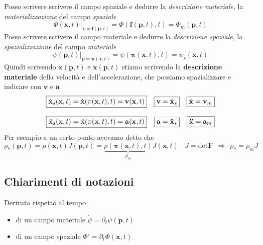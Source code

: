 \documentclass[10pt,a4paper,twoside]{book}
\begin{document}
Posso scrivere scrivere il campo spaziale e dedurre la \textit{descrizione materiale}, la \textit{materializzazione} del campo \textit{spaziale}
\begin{equation*}
\Phi (\mathbf{x} ,t) |_{\mathbf{x} =\mathbf{f}(\mathbf{p} ,t)} =\boxed{\Phi (\mathbf{f}(\mathbf{p} ,t) ,t) =\Phi _{m}(\mathbf{p} ,t)}
\end{equation*}
Posso scrivere scrivere il campo materiale e dedurre la \textit{descrizione spaziale}, la \textit{spazializzazione} del campo \textit{materiale}
\begin{equation*}
\psi (\mathbf{p} ,t) |_{\mathbf{p} =\mathbf{\pi }(\mathbf{x} ,t)} =\boxed{\psi (\mathbf{\pi }(\mathbf{x} ,t) ,t) =\psi _{s}(\mathbf{x} ,t)}
\end{equation*}
Quindi scrivendo $\dot{\mathbf{x}} (\mathbf{p} ,t)$ e $\ddot{\mathbf{x}} (\mathbf{p} ,t)$ stiamo scrivendo la \textbf{descrizione materiale} della velocità e dell'accelerazione, che possiamo spazializzare e indicare con $\mathbf{v}$ e $\mathbf{a}$
\begin{equation*}
\begin{array}{ c c c }
\boxed{\dot{\mathbf{x}}_{s}(\mathbf{x} ,t) =\dot{\mathbf{x}}(\mathbf{\pi }(\mathbf{x} ,t) ,t) =\mathbf{v}(\mathbf{x} ,t)} & \boxed{\mathbf{v} =\dot{\mathbf{x}}_{s}} & \boxed{\dot{\mathbf{x}} =\mathbf{v}_{m}}\\\\
\boxed{\ddot{\mathbf{x}}_{s}(\mathbf{x} ,t) =\ddot{\mathbf{x}}(\mathbf{\pi }(\mathbf{x} ,t) ,t) =\mathbf{a}(\mathbf{x} ,t)} & \boxed{\mathbf{a} =\ddot{\mathbf{x}}_{s}} & \boxed{\mathbf{\ddot{\mathbf{x}}} =\mathbf{a}_{m}}
\end{array}
\end{equation*}
Per esempio a un certo punto avevamo detto che
\begin{equation*}
\rho _{*}(\mathbf{p} ,t) =\rho (\mathbf{x} ,t) J(\mathbf{p} ,t) =\underbrace{\rho (\mathbf{\pi }(\mathbf{x} ,t) ,t)}_{\rho _{m}} J(\mathbf{x} ,t) \ \ \ \ J=\mathrm{det}\mathbf{F} \ \ \Rightarrow \ \ \rho _{*} =\rho _{m} J
\end{equation*}
\subsection{Chiarimenti di notazioni}

Derivata rispetto al tempo
\begin{itemize}
\item di un campo materiale $\dot{\psi } =\partial _{t} \psi (\mathbf{p} ,t)$
\item di un campo spaziale $\Phi '=\partial _{t} \Phi (\mathbf{x} ,t)$
\end{itemize}
\end{document}
